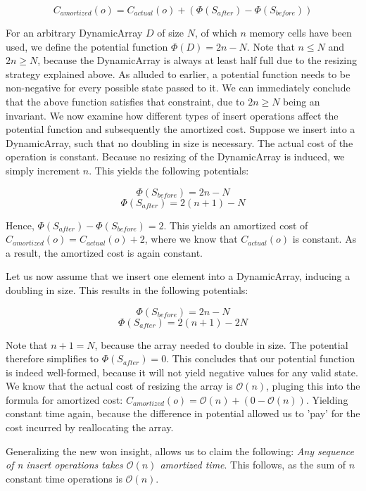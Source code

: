 \[C_{amortized}(o) = C_{actual}(o) + (\Phi(S_{after}) - \Phi(S_{before}))\]
\label{eq:amortized-cost}

For an arbitrary DynamicArray \(D\) of size \(N\), of which \(n\) memory cells have been used,  we define the potential function \(\Phi(D) = 2n - N\). Note that \(n \leq N\) and \(2n \geq N\), because the DynamicArray is always at least half full due to the resizing strategy explained above. 
As alluded to earlier, a potential function needs to be non-negative for every possible state passed to it. We can immediately conclude that the above function satisfies that constraint, due to \(2n \geq N\) being an invariant. We now examine how different types of insert operations affect the potential function and subsequently the amortized cost.
Suppose we insert into a DynamicArray, such that no doubling in size is necessary. The actual cost of the operation is constant. Because no resizing of the DynamicArray is induced, we simply increment \(n\). This yields the following potentials:

\[\Phi(S_{before}) = 2n - N\]
\[\Phi(S_{after}) = 2(n + 1) - N\]

Hence, \(\Phi(S_{after}) - \Phi(S_{before}) = 2\). This yields an amortized cost of \(C_{amortized}(o) = C_{actual}(o) + 2\), where we know that \(C_{actual}(o)\) is constant. As a result, the amortized cost is again constant.

Let us now assume that we insert one element into a DynamicArray, inducing a doubling in size. This results in the following potentials:

\[\Phi(S_{before}) = 2n - N\]
\[\Phi(S_{after}) = 2(n + 1) - 2N\]

Note that \(n + 1 = N\), because the array needed to double in size. The potential therefore simplifies to \(\Phi(S_{after}) = 0\). This concludes that our potential function is indeed well-formed, because it will not yield negative values for any valid state.
We know that the actual cost of resizing the array is \(\mathcal{O}(n)\), pluging this into the formula for amortized cost: \(C_{amortized}(o) = \mathcal{O}(n) + ( 0 - \mathcal{O}(n))\). Yielding constant time again, because the difference in potential allowed us to 'pay' for the cost incurred by reallocating the array.

Generalizing the new won insight, allows us to claim the following: \emph{Any sequence of n insert operations takes \(\mathcal{O}(n)\) amortized time}. This follows, as the sum of \(n\) constant time operations is \(\mathcal{O}(n)\). 

